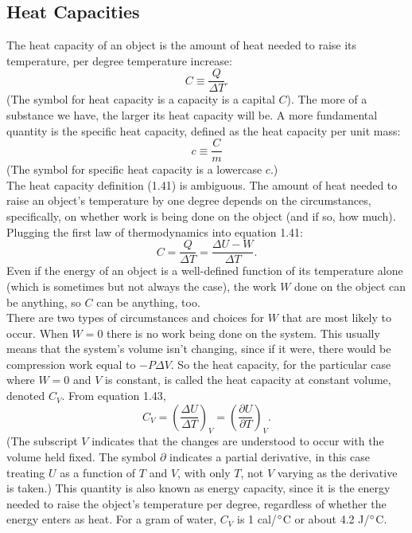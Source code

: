 \documentclass[11pt]{exam}
\begin{document}
\subsection{Heat Capacities}
The heat capacity of an object is the amount of heat needed to raise its temperature, per degree temperature increase:
\begin{equation}\tag{1.41}
C\equiv \frac{Q}{\Delta T}.    
\end{equation}
(The symbol for heat capacity is a capacity is a capital $C$). The more of a substance we have, the larger its heat capacity will be. A more fundamental quantity is the specific heat capacity, defined as the heat capacity per unit mass:
\begin{equation}\tag{1.42}
    c\equiv \frac{C}{m}
\end{equation}
(The symbol for specific heat capacity is a lowercase $c$.)\\
\hspace*{10mm}The heat capacity definition (1.41) is ambiguous. The amount of heat needed to raise an object's temperature by one degree depends on the circumstances, specifically, on whether work is being done on the object (and if so, how much). Plugging the first law of thermodynamics into equation 1.41:
\begin{equation}\tag{1.43}
C=\frac{Q}{\Delta T} = \frac{\Delta U - W}{\Delta T}.     
\end{equation}
Even if the energy of an object is a well-defined function of its temperature alone (which is sometimes but not always the case), the work $W$ done on the object can be anything, so $C$ can be anything, too.\\
\hspace*{10mm}There are two types of circumstances and choices for $W$ that are most likely to occur. When $W = 0$ there is no work being done on the system. This usually means that the system's volume isn't changing, since if it were, there would be compression work equal to $-P\Delta V$. So the heat capacity, for the particular case where $W=0$ and $V$ is constant, is called the heat capacity at constant volume, denoted $C_V$. From equation 1.43, 
\begin{equation}\tag{1.44}
C_V = \left(\frac{\Delta U}{\Delta T}\right)_V = \left(\frac{\partial U}{\partial T}\right)_V.
\end{equation}
(The subscript $V$ indicates that the changes are understood to occur with the volume held fixed. The symbol $\partial$ indicates a partial derivative, in this case treating $U$ as a function of $T$ and $V$, with only $T$, not $V$ varying as the derivative is taken.) This quantity is also known as energy capacity, since it is the energy needed to raise the object's temperature per degree, regardless of whether the energy enters as heat. For a gram of water, $C_V$ is 1 cal/$\degree$C or about 4.2 J/$\degree$C.\\
\end{document}
